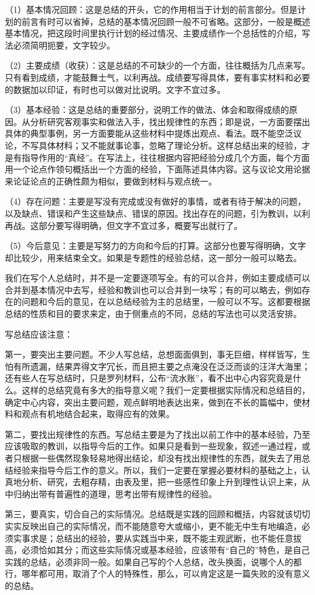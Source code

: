 （1）基本情况回顾：这是总结的开头，它的作用相当于计划的前言部分。但是计划的前言有时可以省掉，总结的基本情况回顾一般不可省略。这部分，一般是概述基本情况，把这段时间里执行计划的经过情况、主要成绩作一个总括性的介绍，写法必须简明扼要，文字较少。

（2）主要成绩（收获）：这是总结的不可缺少的一个方面，往往概括为几点来写。只有看到成绩，才能鼓舞士气，以利再战。成绩要写得具体，要有事实材料和必要的数据加以印证，有时也可以做对比说明。文字不宜过多。

（3）基本经验：这是总结的重要部分，说明工作的做法、体会和取得成绩的原因。从分析研究客观事实和做法入手，找出规律性的东西；即是说，一方面要摆出具体的典型事例，另一方面要能从这些材料中提炼出观点、看法。既不能空泛议论，不写具体材料；又不能就事论事，忽略了理论分析。这样总结出来的经验，才是有指导作用的“真经”。在写法上，往往根据内容把经验分成几个方面，每个方面用一个论点作领句概括出一个方面的经验，下面陈述具体内容。这与议论文用论据来论证论点的正确性颇为相似，要做到材料与观点统一。

（4）存在问题：主要是写没有完成或没有做好的事情，或者有待于解决的问题，以及缺点、错误和产生这些缺点、错误的原因。找出存在的问题，引为教训，以利再战。这部分要写得明确，但文字不宜过多，概要写出就行了。

（5）今后意见：主要是写努力的方向和今后的打算。这部分也要写得明确，文字却比较少，用来结束全文。如果是专题性的经验总结，这一部分一般可以略去。

我们在写个人总结时，并不是一定要逐项写全。有的可以合并，例如主要成绩可以合并到基本情况中去写，经验和教训也可以合并到一块写；有的可以略去，例如存在的问题和今后的意见，在以总结经验为主的总结里，一般可以不写。这都要根据总结的性质和目的要求来定，由于侧重点的不同，总结的写法也可以灵活安排。

写总结应该注意：

第一，要突出主要问题。不少人写总结，总想面面俱到，事无巨细，样样皆写，生怕有所遗漏，结果弄得文字冗长，而且把主要之点淹没在泛泛而谈的汪洋大海里；还有些人在写总结时，只是罗列材料，公布“流水账”，看不出中心内容究竟是什么。这样的总结究竟有多大的指导意义呢？我们一定要根据实际情况和总结目的，确定中心内容，突出主要问题，观点鲜明地表达出来，做到在不长的篇幅中，使材料和观点有机地结合起来，取得应有的效果。

第二，要找出规律性的东西。写总结主要是为了找出以前工作中的基本经验，乃至应该吸取的教训，以指导今后的工作。如果只是看到一些现象，叙述一通过程，或者只根据一些偶然现象轻易地得出结论，却没有找出规律性的东西，就失去了用总结经验来指导今后工作的意义。所以，我们一定要在掌握必要材料的基础之上，认真地分析、研究，去粗存精，由表及里，把一些感性印象上升到理性认识上来，从中归纳出带有普遍性的道理，思考出带有规律性的经验。

第三，要真实，切合自己的实际情况。总结既是实践的回顾和概括，内容就该切切实实反映出自己的实际情况，而不能随意夸大或缩小，更不能无中生有地编造，必须实事求是；总结出的经验，要从实践当中来，既不能主观武断，也不能任意拔高，必须恰如其分；而这些实际情况或基本经验，应该带有“自己的”特色，是自己实践的总结，必须非同一般。如果自己写的个人总结，改头换面，说哪个人的都行，哪年都可用，取消了个人的特殊性，那么，可以肯定这是一篇失败的没有意义的总结。
\newpage